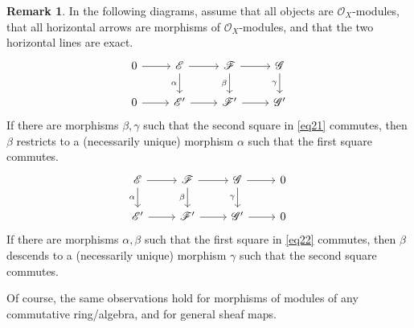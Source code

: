 \documentclass[12pt,b5paper,notitlepage]{report}
\theoremstyle{definition}
\newtheorem{rem}[df]{Remark}
\theoremstyle{plain}
\newcommand{\scr}{\mathscr}
\numberwithin{equation}{section}
\begin{document}
\begin{rem}\label{lb47}
In the following diagrams, assume that all objects are $\scr O_X$-modules, that all horizontal arrows are morphisms of $\scr O_X$-modules, and that the two horizontal lines are exact.
\begin{equation}\label{eq21}
\begin{tikzcd}
0 \arrow[r] & \scr E \arrow[r] \arrow[d, "\alpha"'] & \scr F \arrow[r] \arrow[d, "\beta"'] & \scr G\arrow[d, "\gamma"']\\
0 \arrow[r] & \scr E' \arrow[r]                     & \scr F' \arrow[r]                    & \scr G'                    
\end{tikzcd}
\end{equation}
If there are morphisms $\beta,\gamma$ such that the second square in \eqref{eq21} commutes, then $\beta$ restricts to a (necessarily unique) morphism $\alpha$ such that the first square commutes. 
\begin{equation}\label{eq22}
\begin{tikzcd}
\scr E \arrow[r] \arrow[d, "\alpha"'] & \scr F \arrow[r] \arrow[d, "\beta"'] & \scr G \arrow[r] \arrow[d, "\gamma"'] & 0 \\
\scr E' \arrow[r]                     & \scr F' \arrow[r]                    & \scr G' \arrow[r]                     & 0
\end{tikzcd}
\end{equation}
If there are morphisms $\alpha,\beta$ such that the first square in \eqref{eq22} commutes, then $\beta$ descends to a (necessarily unique) morphism $\gamma$ such that the second square commutes.

Of course, the same observations hold for morphisms of modules of any commutative ring/algebra, and for general sheaf maps.\hfill\qedsymbol
\end{rem}
\end{document}
